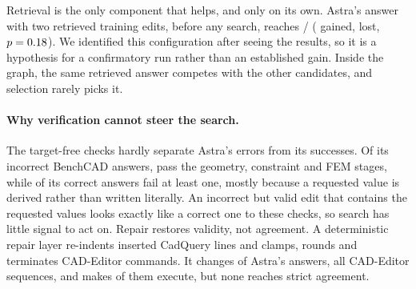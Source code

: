 Retrieval is the only component that helps, and only on its own. Astra's answer with two retrieved training edits, before any search, reaches \pipeRag/\pipeN{} (\pipeRagGain{} gained, \pipeRagLoss{} lost, $p=0.18$). We identified this configuration after seeing the results, so it is a hypothesis for a confirmatory run rather than an established gain. Inside the graph, the same retrieved answer competes with the other candidates, and selection rarely picks it.

\paragraph{Why verification cannot steer the search.}
The target-free checks hardly separate Astra's errors from its successes. Of its \pipeWrong{} incorrect BenchCAD answers, \pipeWrongPass{} pass the geometry, constraint and FEM stages, while \pipeRightFail{} of its \pipeRight{} correct answers fail at least one, mostly because a requested value is derived rather than written literally. An incorrect but valid edit that contains the requested values looks exactly like a correct one to these checks, so search has little signal to act on. Repair restores validity, not agreement. A deterministic repair layer re-indents inserted CadQuery lines and clamps, rounds and terminates CAD-Editor commands. It changes \pipeFixChanged{} of Astra's \pipeFixTasks{} answers, all CAD-Editor sequences, and makes \pipeFixExec{} of them execute, but none reaches strict agreement.
